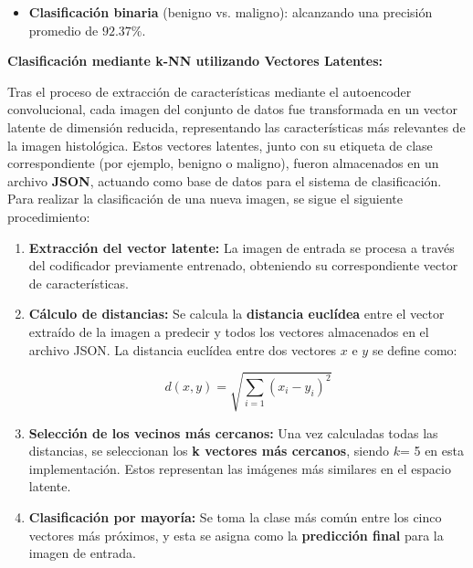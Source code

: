 \documentclass[12pt]{article} %
\begin{document}
\begin{itemize}
    \item \textbf{Clasificación binaria} (benigno vs. maligno): alcanzando una precisión promedio de \textbf{$92.37\%$}.
\end{itemize}

\textbf{Clasificación mediante k-NN utilizando Vectores Latentes:}

Tras el proceso de extracción de características mediante el autoencoder convolucional, cada imagen del conjunto de datos fue transformada en un vector latente de dimensión reducida, representando las características más relevantes de la imagen histológica. Estos vectores latentes, junto con su etiqueta de clase correspondiente (por ejemplo, benigno o maligno), fueron almacenados en un archivo \textbf{JSON}, actuando como base de datos para el sistema de clasificación.\\

Para realizar la clasificación de una nueva imagen, se sigue el siguiente procedimiento:

\begin{enumerate}
    \item \textbf{Extracción del vector latente:} La imagen de entrada se procesa a través del codificador previamente entrenado, obteniendo su correspondiente vector de características.
    
    \item \textbf{Cálculo de distancias:} Se calcula la \textbf{distancia euclídea} entre el vector extraído de la imagen a predecir y todos los vectores almacenados en el archivo JSON. La distancia euclídea entre dos vectores \( x \) e \( y \) se define como:
    
    \begin{equation}
        d(x, y) = \sqrt{ \sum_{i=1} (x_i - y_i)^2 }
    \end{equation}

    \item \textbf{Selección de los vecinos más cercanos:} Una vez calculadas todas las distancias, se seleccionan los \textbf{k vectores más cercanos}, siendo \(k \)= 5 en esta implementación. Estos representan las imágenes más similares en el espacio latente.
    \item \textbf{Clasificación por mayoría:} Se toma la clase más común entre los cinco vectores más próximos, y esta se asigna como la \textbf{predicción final} para la imagen de entrada.

\end{enumerate}
\end{document}
